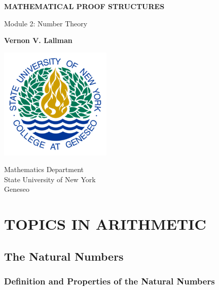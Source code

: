 \documentclass{book}
\theoremstyle{definition}
\theoremstyle{remark}
\begin{document}
\begin{titlepage}
    \begin{center}
        \vspace*{1cm}
        
        \textbf{MATHEMATICAL PROOF STRUCTURES}
        
        \vspace{0.5cm}
        Module 2: Number Theory
        
        \vspace{1.5cm}
        
        \textbf{Vernon V. Lallman}
        
        \vfill
        
        
        \vspace{0.8cm}
        
        \includegraphics[width=0.4\textwidth]{university}
        
        Mathematics Department\\
        State University of New York \\
        Geneseo\\
        \date{\today}
        
    \end{center}
\end{titlepage}

\tableofcontents

\newpage
\chapter{TOPICS IN ARITHMETIC}

\section{The Natural Numbers}
\subsection{Definition and Properties of the Natural Numbers}
\end{document}
